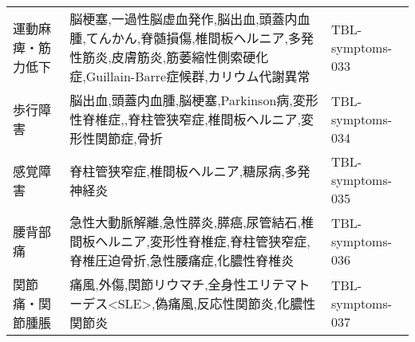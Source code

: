 \begin{xltabular}{\linewidth}{XXX}
運動麻痺・筋力低下 & 脳梗塞,一過性脳虚血発作,脳出血,頭蓋内血腫,てんかん,脊髄損傷,椎間板ヘルニア,多発性筋炎,皮膚筋炎,筋萎縮性側索硬化症,Guillain-Barre症候群,カリウム代謝異常 & TBL-symptoms-033 \\
歩行障害 & 脳出血,頭蓋内血腫,脳梗塞,Parkinson病,変形性脊椎症,,脊柱管狭窄症,椎間板ヘルニア,変形性関節症,骨折 & TBL-symptoms-034 \\
感覚障害 & 脊柱管狭窄症,椎間板ヘルニア,糖尿病,多発神経炎 & TBL-symptoms-035 \\
腰背部痛 & 急性大動脈解離,急性膵炎,膵癌,尿管結石,椎間板ヘルニア,変形性脊椎症,脊柱管狭窄症,脊椎圧迫骨折,急性腰痛症,化膿性脊椎炎 & TBL-symptoms-036 \\
関節痛・関節腫脹 & 痛風,外傷,関節リウマチ,全身性エリテマトーデス<SLE>,偽痛風,反応性関節炎,化膿性関節炎 & TBL-symptoms-037 \\
\bottomrule
\end{xltabular}


